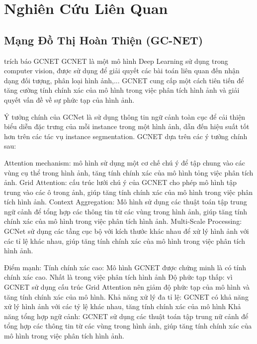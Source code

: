 \chapter{Nghiên Cứu Liên Quan}
\label{chap:Nghiên Cứu Liên Quan}



\section{Mạng Đồ Thị Hoàn Thiện (GC-NET)}
\label{sec:Mạng Đồ Thị Hoàn Thiện}

trích báo GCNET
GCNET là một mô hình Deep Learning sử dụng trong computer vision, được sử dụng để giải quyết các bài toán liên quan đến nhận dạng đối tượng, phân loại hình ảnh,... 
GCNET cung cấp một cách tiên tiến để tăng cường tính chính xác của mô hình trong việc phân tích hình ảnh và giải quyết vấn đề về sự phức tạp của hình ảnh.

Ý tưởng chính của GCNet là sử dụng thông tin ngữ cảnh toàn cục để cải thiện biểu diễn đặc trưng của mỗi instance trong một hình ảnh, dẫn đến hiệu suất tốt hơn trên các tác vụ instance segmentation.
GCNET dựa trên các ý tưởng chính sau:

Attention mechanism: mô hình sử dụng một cơ chế chú ý để tập chung vào các vùng cụ thể trong hình ảnh, tăng tính chính xác của mô hình tỏng việc phân tích ảnh.
Grid Attention: cấu trúc lưới chú ý của GCNET cho phép mô hình tập trung vào các ô trong ảnh, giúp tăng tính chính xác của mô hình trong việc phân tích hình ảnh.
Context Aggregation: Mô hình sử dụng các thuật toán tập trung ngữ cảnh để tổng hợp các thông tin từ các vùng trong hình ảnh, giúp tăng tính chính xác của mô hình trong việc phân tích hình ảnh.
Multi-Scale Processing: GCNet sử dụng các tầng cục bộ với kích thước khác nhau để xử lý hình ảnh với các tỉ lệ khác nhau, giúp tăng tính chính xác của mô hình trong việc phân tích hình ảnh.


Điểm mạnh:
Tính chính xác cao: Mô hình GCNET được chứng minh là có tính chính xác cao. Nhất là trong việc phân tích hình ảnh
Độ phức tạp thấp: vì GCNET sử dụng cấu trúc Grid Attention nên giảm độ phức tạp của mô hình và tăng tính chính xác của mô hình.
Khả năng xử lý đa tỉ lệ: GCNET có khả năng xử lý hình ảnh với các tỷ lệ khác nhau, tăng tính chính xác của mô hình
Khả năng tổng hợp ngữ cảnh: GCNET sử dụng các thuật toán tập trung nữ cảnh để tổng hợp các thông tin từ các vùng trong hình ảnh, giúp tăng tính chính xác của mô hình trong việc phân tích hình ảnh.

